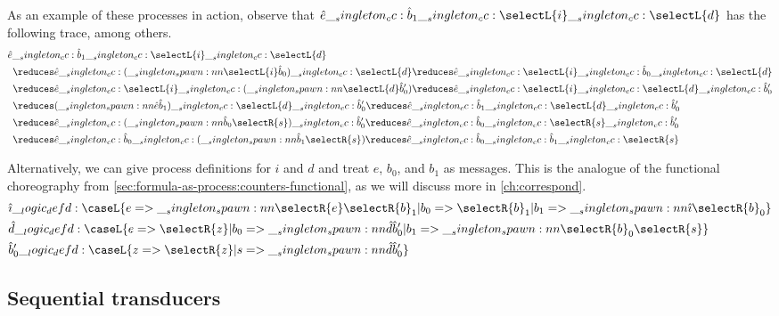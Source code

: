 As an example of these processes in action, observe that $\defp{e} \cc \defp{b}_1 \cc \selectL{i} \cc \selectL{d}$ has the following trace, among others.
\begin{align*}
  \MoveEqLeft[.5]
  \defp{e} \cc \defp{b}_1 \cc \selectL{i} \cc \selectL{d} \\
    &\reduces \defp{e} \cc (\spawn{\selectL{i}}{\defp{b}_0}) \cc \selectL{d}
     \reduces \defp{e} \cc \selectL{i} \cc \defp{b}_0 \cc \selectL{d} \\
    &\reduces \defp{e} \cc \selectL{i} \cc (\spawn{\selectL{d}}{\defp{b}'_0})
     \reduces \defp{e} \cc \selectL{i} \cc \selectL{d} \cc \defp{b}'_0 \\
    &\reduces (\spawn{\defp{e}}{\defp{b}_1}) \cc \selectL{d} \cc \defp{b}'_0
     \reduces \defp{e} \cc \defp{b}_1 \cc \selectL{d} \cc \defp{b}'_0 \\
    &\reduces \defp{e} \cc (\spawn{\defp{b}_0}{\selectR{s}}) \cc \defp{b}'_0
     \reduces \defp{e} \cc \defp{b}_0 \cc \selectR{s} \cc \defp{b}'_0 \\
    &\reduces \defp{e} \cc \defp{b}_0 \cc (\spawn{\defp{b}_1}{\selectR{s}})
     \reduces \defp{e} \cc \defp{b}_0 \cc \defp{b}_1 \cc \selectR{s}
\end{align*}


Alternatively, we can give process definitions for $i$ and $d$ and treat $e$, $b_0$, and $b_1$ as messages.  This is the analogue of the functional choreography from \cref{sec:formula-as-process:counters-functional}, as we will discuss more in \cref{ch:correspond}.
\begin{equation*}
  \begin{lgathered}
    \defp{\imath} \defd \caseL{e => \spawn{\selectR{e}}{\selectR{b}_1}
                             | b_0 => \selectR{b}_1
                             | b_1 => \spawn{\defp{\imath}}{\selectR{b}_0}}
    \\
    \defp{d} \defd \caseL{e => \selectR{z}
                        | b_0 => \spawn{\defp{d}}{\defp{b}'_0}
                        | b_1 => \spawn{\selectR{b}_0}{\selectR{s}}}
    \\
    \defp{b}'_0 \defd \caseL{z => \selectR{z}
                           | s => \spawn{\defp{d}}{\defp{b}'_0}}
  \end{lgathered}
\end{equation*}



\subsection{Sequential transducers}\label{sec:process-chains:transducer}

